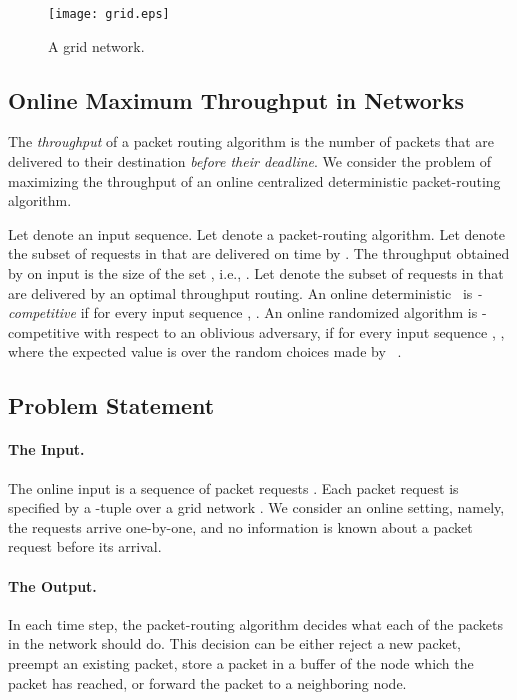\documentclass[11pt]{article}
\newcommand{\alg}{\text{\sc{alg}}}
\newenvironment{proof sketch}[1]{\noindent {\emph{Proof sketch of #1:}}}{\hfill \qed}
\begin{document}
  \begin{figure}[H]
    \begin{center}
      \texttt{[image: grid.eps]}
    \end{center}
    \caption{A  grid network.}
    \label{fig:grid}
  \end{figure}

\subsection{Online Maximum Throughput in Networks}
The \emph{throughput} of a packet routing algorithm is the number of packets that are delivered to their destination \emph{before their deadline}.
We consider the problem of maximizing the throughput of an online centralized deterministic packet-routing algorithm.

Let  denote an input sequence. Let  denote a packet-routing
algorithm. Let  denote the subset of requests in  that
are delivered on time by . The throughput obtained by  on input
 is the size of the set , i.e., . Let
 denote the subset of requests in  that are delivered
by an optimal throughput routing. An online deterministic \alg\ is
\emph{-competitive} if for every input sequence ,
. An online randomized
algorithm is -competitive with respect to an oblivious adversary, if
for every input sequence , , where the expected value is over the random choices made by
\alg~\cite{be}.

\subsection{Problem Statement}\label{sec:problem statement}
\paragraph{The Input.}
The online input is a sequence of packet requests . Each
packet request is  specified by a -tuple  over a
grid network . We consider an online setting, namely, the requests
arrive one-by-one, and no information is known about a packet request 
before its arrival.

\paragraph{The Output.}
In each time step, the packet-routing algorithm decides what each of the packets in
the network should do. This decision can be either reject a new packet,
preempt an existing packet, store a packet in a buffer of the node which the
packet has reached, or forward the packet to a neighboring node.
\end{document}
